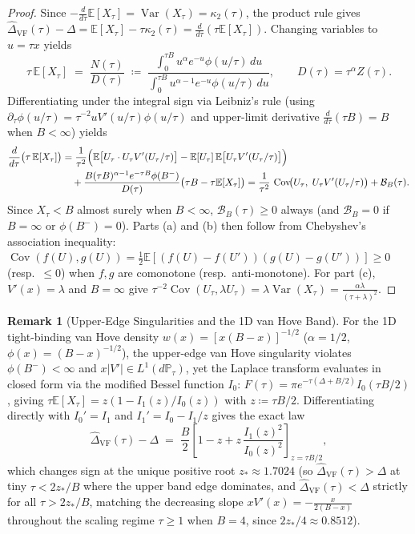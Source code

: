 \documentclass[11pt,a4paper]{article}
\theoremstyle{definition}
\newtheorem{remark}[theorem]{Remark}
\newcommand{\E}{\mathbb{E}}
\newcommand{\Var}{\operatorname{Var}}
\newcommand{\Cov}{\operatorname{Cov}}
\begin{document}
\begin{proof}
Since $-\frac{d}{d\tau}\E[X_\tau] = \Var(X_\tau) = \kappa_2(\tau)$, the product rule gives $\widehat{\Delta}_{\mathrm{VF}}(\tau) - \Delta = \E[X_\tau] - \tau \kappa_2(\tau) = \frac{d}{d\tau}(\tau \E[X_\tau])$. Changing variables to $u = \tau x$ yields
\[
  \tau\,\E[X_\tau] \;=\; \frac{N(\tau)}{D(\tau)} \;\coloneqq\; \frac{\int_0^{\tau B} u^{\alpha} e^{-u} \phi(u/\tau)\, du}{\int_0^{\tau B} u^{\alpha - 1} e^{-u} \phi(u/\tau)\, du},
  \qquad D(\tau) = \tau^\alpha Z(\tau).
\]
Differentiating under the integral sign via Leibniz's rule (using $\partial_\tau \phi(u/\tau) = \tau^{-2} u V'(u/\tau)\phi(u/\tau)$ and upper-limit derivative $\frac{d}{d\tau}(\tau B) = B$ when $B < \infty$) yields
\begin{align*}
  \frac{d}{d\tau}\bigl(\tau\,\E[X_\tau]\bigr)
  &= \frac{1}{\tau^2}\Bigl(\E\bigl[U_\tau \cdot U_\tau V'(U_\tau/\tau)\bigr] - \E[U_\tau]\,\E\bigl[U_\tau V'(U_\tau/\tau)\bigr]\Bigr) \\
  &\quad + \frac{B (\tau B)^{\alpha - 1} e^{-\tau B} \phi(B^-)}{D(\tau)}\bigl(\tau B - \tau\E[X_\tau]\bigr)
   = \frac{1}{\tau^2}\,\Cov\!\bigl(U_\tau,\; U_\tau V'(U_\tau/\tau)\bigr) + \mathcal{B}_B(\tau).
\end{align*}
Since $X_\tau < B$ almost surely when $B < \infty$, $\mathcal{B}_B(\tau) \ge 0$ always (and $\mathcal{B}_B = 0$ if $B = \infty$ or $\phi(B^-) = 0$). Parts (a) and (b) then follow from Chebyshev's association inequality: $\Cov(f(U), g(U)) = \frac{1}{2}\E[(f(U)-f(U'))(g(U)-g(U'))] \ge 0$ (resp.\ $\le 0$) when $f, g$ are comonotone (resp.\ anti-monotone). For part (c), $V'(x) = \lambda$ and $B = \infty$ give $\tau^{-2}\Cov(U_\tau, \lambda U_\tau) = \lambda \Var(X_\tau) = \frac{\alpha\lambda}{(\tau+\lambda)^2}$.
\end{proof}

\begin{remark}[Upper-Edge Singularities and the 1D van Hove Band]
\label{rem:vanhove_bessel}
For the 1D tight-binding van Hove density $w(x) = [x(B-x)]^{-1/2}$ ($\alpha = 1/2$, $\phi(x) = (B-x)^{-1/2}$), the upper-edge van Hove singularity violates $\phi(B^-) < \infty$ and $x|V'| \in L^1(d\mathbb{P}_\tau)$, yet the Laplace transform evaluates in closed form via the modified Bessel function $I_0$: $F(\tau) = \pi e^{-\tau(\Delta + B/2)} I_0(\tau B / 2)$, giving $\tau \E[X_\tau] = z(1 - I_1(z)/I_0(z))$ with $z \coloneqq \tau B / 2$. Differentiating directly with $I_0' = I_1$ and $I_1' = I_0 - I_1/z$ gives the exact law
\[
  \widehat{\Delta}_{\mathrm{VF}}(\tau) - \Delta
  \;=\; \frac{B}{2}\left[1 - z + z\,\frac{I_1(z)^2}{I_0(z)^2}\right]_{z = \tau B/2},
\]
which changes sign at the unique positive root $z_* \approx 1.7024$ (so $\widehat{\Delta}_{\mathrm{VF}}(\tau) > \Delta$ at tiny $\tau < 2 z_*/B$ where the upper band edge dominates, and $\widehat{\Delta}_{\mathrm{VF}}(\tau) < \Delta$ strictly for all $\tau > 2 z_*/B$, matching the decreasing slope $x V'(x) = -\frac{x}{2(B-x)}$ throughout the scaling regime $\tau \ge 1$ when $B = 4$, since $2 z_*/4 \approx 0.8512$).
\end{remark}
\end{document}
